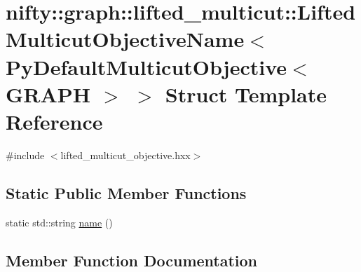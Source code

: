 \hypertarget{structnifty_1_1graph_1_1lifted__multicut_1_1LiftedMulticutObjectiveName_3_01PyDefaultMulticutObjective_3_01GRAPH_01_4_01_4}{}\section{nifty\+:\+:graph\+:\+:lifted\+\_\+multicut\+:\+:Lifted\+Multicut\+Objective\+Name$<$ Py\+Default\+Multicut\+Objective$<$ G\+R\+A\+P\+H $>$ $>$ Struct Template Reference}
\label{structnifty_1_1graph_1_1lifted__multicut_1_1LiftedMulticutObjectiveName_3_01PyDefaultMulticutObjective_3_01GRAPH_01_4_01_4}


{\ttfamily \#include $<$lifted\+\_\+multicut\+\_\+objective.\+hxx$>$}

\subsection*{Static Public Member Functions}
\begin{DoxyCompactItemize}
\item 
static std\+::string \hyperlink{structnifty_1_1graph_1_1lifted__multicut_1_1LiftedMulticutObjectiveName_3_01PyDefaultMulticutObjective_3_01GRAPH_01_4_01_4_a740cfb0a253c580e46ec9f6803fa1498}{name} ()
\end{DoxyCompactItemize}


\subsection{Member Function Documentation}
\hypertarget{structnifty_1_1graph_1_1lifted__multicut_1_1LiftedMulticutObjectiveName_3_01PyDefaultMulticutObjective_3_01GRAPH_01_4_01_4_a740cfb0a253c580e46ec9f6803fa1498}{}
